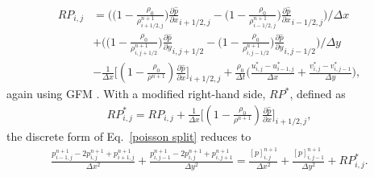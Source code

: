 \begin{equation}
  \begin{aligned}
    RP_{i,j} &= 
    \bigg( \big(1-\frac{\rho_0}{\rho^{n+1}_{i+1/2,j}}) \frac{\partial \hat{p}}{\partial x}_{i+1/2,j}
    -      \big(1-\frac{\rho_0}{\rho^{n+1}_{i-1/2,j}}) \frac{\partial \hat{p}}{\partial x}_{i-1/2,j} \bigg) \big/\Delta x \\
    &+\bigg(\big(1-\frac{\rho_0}{\rho^{n+1}_{i,j+1/2}}) \frac{\partial \hat{p}}{\partial y}_{i,j+1/2}
    -       \big(1-\frac{\rho_0}{\rho^{n+1}_{i,j-1/2}}) \frac{\partial \hat{p}}{\partial y}_{i,j-1/2} \bigg) \big/\Delta y \\
    &- \frac{1}{\Delta x} \bigg[(1-\frac{\rho_0}{\rho^{n+1}}) \frac{\partial \hat{p}}{\partial x} \bigg]_{i+1/2,j} 
    +\frac{\rho_0}{\Delta t} \bigg( \frac{u^*_{i,j} - u^*_{i-1,j}}{\Delta x} + \frac{v^*_{i,j} - v^*_{i,j-1}}{\Delta y} \bigg),
  \end{aligned}
  \label{jump3}
\end{equation}
again using GFM \citep{Liu_JCP_2000}.  With a modified right-hand side, $RP^*$, defined as
\begin{equation}
  \begin{aligned}
    RP_{i,j}^* = RP_{i,j} + 
    \frac{1}{\Delta x} 
    \bigg[ (1-\frac{\rho_0}{\rho^{n+1}}) \frac{\partial \hat{p}}{\partial x} \bigg]_{i+1/2,j},
  \end{aligned}
  \label{jump4}
\end{equation}
the discrete form of Eq.\ \eqref{poisson split} reduces to
\begin{equation}
  \begin{aligned}
    \frac{p^{n+1}_{i-1,j}-2p^{n+1}_{i,j}+p^{n+1}_{i+1,j} }{\Delta x^2} + \frac{p^{n+1}_{i,j-1}-2p^{n+1}_{i,j}+p^{n+1}_{i,j+1} }{\Delta y^2} = 
    \frac{[p]^{n+1}_{i,j}}{\Delta x^2} + \frac{[p]^{n+1}_{i,j-1}}{\Delta y^2} + RP_{i,j}^*.
  \end{aligned}
  \label{gfm+split projection xy}
\end{equation}


